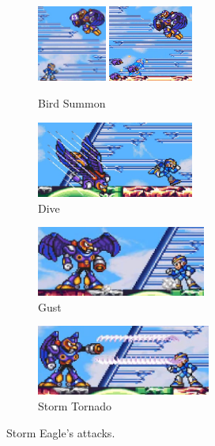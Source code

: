 \begin{figure}[htp]
	\centering
	\begin{subfigure}{.45\linewidth}
		\centering
		\includegraphics[height=2.5cm]{figures/X1/Storm_eagle/Eagle_egg_1.jpg}
		\includegraphics[height=2.5cm]{figures/X1/Storm_eagle/Eagle_egg_2.jpg}
		\caption{Bird Summon}
	\end{subfigure}
	\begin{subfigure}{.45\linewidth}
		\centering
		\includegraphics[height=2.5cm]{figures/X1/Storm_eagle/Eagle_dive.jpg}
		\caption{Dive}
	\end{subfigure}
	\begin{subfigure}{.49\linewidth}
		\centering
		\includegraphics[height=2.3cm]{figures/X1/Storm_eagle/Eagle_push.jpg}
		\caption{Gust}
	\end{subfigure}
	\begin{subfigure}{.49\linewidth}
		\centering
		\includegraphics[height=2.3cm]{figures/X1/Storm_eagle/Eagle_tornado.jpg}
		\caption{Storm Tornado}
	\end{subfigure}
	\caption{Storm Eagle's attacks.}
\end{figure}

